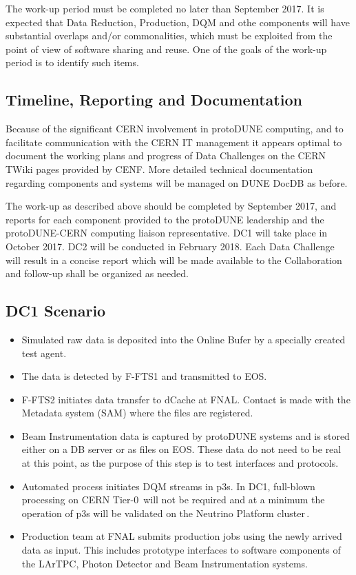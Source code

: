 \documentclass[pdftex,12pt,letter]{article}
\newcommand{\pd}{protoDUNE\xspace}
\begin{document}
\noindent The work-up period must be completed no later than September 2017. It is expected that Data Reduction, Production, DQM
and othe components will have substantial overlaps and/or commonalities, which must be exploited from the point of view of software
sharing and reuse. One of the goals of the work-up period is to identify such items.

\subsection{Timeline, Reporting and Documentation}
Because of the significant CERN involvement in \pd computing, and to facilitate communication with the CERN IT management
it appears optimal to document the working plans and progress of Data Challenges on the CERN TWiki pages provided by
CENF. More detailed technical documentation regarding components and systems will be managed on DUNE DocDB as before.

The work-up as described above should be completed by September 2017, and reports for each component provided
to the \pd leadership and the \pd-CERN computing liaison representative. DC1 will take place in October 2017.
DC2 will be conducted in February 2018. Each Data Challenge will result in a concise report which will be made available
to the Collaboration and follow-up shall be organized as needed.

\subsection{DC1 Scenario}

\begin{itemize}

\item Simulated raw data is deposited into the Online Bufer by a specially created test agent.

\item The data is detected by F-FTS1 and transmitted to EOS.

\item F-FTS2 initiates data transfer to dCache at FNAL. Contact is made with the Metadata system (SAM) where the files
are registered.

\item Beam Instrumentation data is captured by \pd systems and is stored either on a DB server or as files on EOS.
These data do not need to be real at this point, as the purpose of this step is to test interfaces and protocols.

\item Automated process initiates DQM streams in p3s. In DC1, full-blown processing on CERN Tier-0\,\cite{lxbatch}
will not be required and at a minimum the operation of p3s will be validated on the Neutrino Platform cluster\,\cite{neut}.

\item Production team at FNAL submits production jobs using the newly arrived data as input. This includes prototype interfaces
to software components of the LArTPC, Photon Detector and Beam Instrumentation systems.

\end{itemize}
\end{document}
